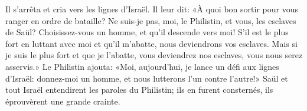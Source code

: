 Il s’arrêta et cria vers les lignes d’Israël. Il leur dit:
	«À quoi bon sortir pour vous ranger en ordre de bataille?
	Ne suis-je pas, moi, le Philistin, et vous, les esclaves de Saül?
	Choisissez-vous un homme, et qu’il descende vers moi!
S’il est le plus fort en luttant avec moi et qu’il m’abatte,
	nous deviendrons vos esclaves.
Mais si je suis le plus fort et que je l’abatte,
	vous deviendrez nos esclaves, vous nous serez asservis.»
Le Philistin ajouta: «Moi, aujourd’hui, je lance un défi aux lignes d’Israël:
	donnez-moi un homme, et nous lutterons l’un contre l’autre!»
Saül et tout Israël entendirent les paroles du Philistin;
	ils en furent consternés, ils éprouvèrent une grande crainte.
